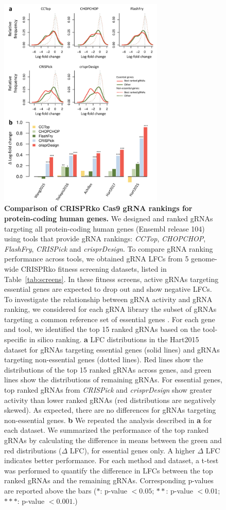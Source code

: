 \documentclass[pdftex,english,10pt]{article}
\begin{document}
\begin{figure}
\centering
\includegraphics[width=0.7\textwidth]{figures/rankings/rankings.pdf}
  \caption{\textbf{Comparison of CRISPRko Cas9 gRNA rankings for protein-coding human genes.} We designed and ranked gRNAs targeting all protein-coding human genes (Ensembl release 104) using tools that provide gRNA rankings: \textit{CCTop}, \textit{CHOPCHOP}, \textit{FlashFry}, \textit{CRISPick} and \textit{crisprDesign}. To compare gRNA ranking performance across tools, we obtained gRNA LFCs from 5 genome-wide CRISPRko fitness screening datasets, listed in Table~\ref{tab:screens}. In these fitness screens, active gRNAs targeting essential genes are expected to drop out and show negative LFCs. To investigate the relationship between gRNA activity and gRNA ranking, we considered for each gRNA library the subset of gRNAs targeting a common reference set of essential genes \citep{hart2014}. For each gene and tool, we identified the top 15 ranked gRNAs based on the tool-specific in silico ranking. \textbf{a} LFC distributions in the Hart2015 dataset for gRNAs targeting essential genes (solid lines) and gRNAs targeting non-essential genes (dotted lines). Red lines show the distributions of the top 15 ranked gRNAs across genes, and green lines show the distributions of remaining gRNAs. For essential genes, top ranked gRNAs from \textit{CRISPick} and \textit{crisprDesign} show greater activity than lower ranked gRNAs (red distributions are negatively skewed). As expected, there are no differences for gRNAs targeting non-essential genes. \textbf{b} We repeated the analysis described in \textbf{a} for each dataset. We summarized the performance of the top ranked gRNAs by calculating the difference in means between the green and red distributions ($\Delta$ LFC), for essential genes only. A higher $\Delta$ LFC indicates better performance.  For each method and dataset, a t-test was performed to quantify the difference in LFCs between the top ranked gRNAs and the remaining gRNAs. Corresponding p-values are reported above the bars ($*$: p-value $<0.05$; $**$: p-value $<0.01$; $***$: p-value $<0.001$.)
}
\end{figure}
\end{document}
